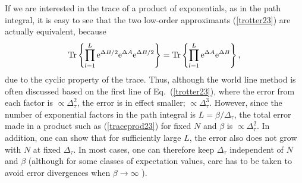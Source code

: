 \documentclass[draft,numberedheadings]{aipproc}
\begin{document}
If we are interested in the trace of a product of exponentials, as in the path integral, it is easy to see that the two low-order approximants (\ref{trotter23})
are actually equivalent, because
\begin{equation}
{\rm Tr} \left \{ \prod_{l=1}^L {\rm e}^{\Delta B/2}{\rm e}^{\Delta A}{\rm e}^{\Delta B/2} \right \} =
{\rm Tr} \left \{ \prod_{l=1}^L {\rm e}^{\Delta A}{\rm e}^{\Delta B} \right \},
\label{traceprod23}
\end{equation}
due to the cyclic property of the trace. Thus, although the world line method is often discussed based on the first line of Eq.~(\ref{trotter23}), where the
error from each factor is $\propto \Delta_\tau^2$, the error is in effect smaller; $\propto \Delta_\tau^3$. However, since the number of exponential factors in the 
path integral is $L=\beta/\Delta_\tau$, the total error made in a product such as (\ref{traceprod23}) for fixed $N$ and $\beta$ is $\propto \Delta_\tau^2$. In
addition, one can show that for sufficiently large $L$, the error also does not grow with $N$ at fixed $\Delta_\tau$. In most cases, one can therefore keep
$\Delta_\tau$ independent of $N$ and $\beta$ (although for some classes of expectation values, care has to be taken to avoid error divergences when $\beta \to \infty$ 
\cite{fye86,fye87}).
\end{document}
